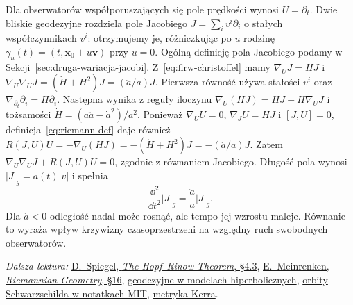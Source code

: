 \begin{przyklad}
\label{prz:flrw-jacobi}
Dla obserwatorów współporuszających się pole prędkości wynosi
$U=\partial_t$. Dwie bliskie geodezyjne rozdziela pole Jacobiego
$J=\sum_i v^i\partial_i$ o stałych współczynnikach $v^i$:
otrzymujemy je, różniczkując po $u$ rodzinę
$\gamma_u(t)=(t,\mathbf x_0+u\mathbf v)$ przy $u=0$.
Ogólną definicję pola Jacobiego podamy w
Sekcji~\ref{sec:druga-wariacja-jacobi}.
Z~\eqref{eq:flrw-christoffel} mamy
$\nabla_UJ=HJ$ i
$\nabla_U\nabla_UJ=(\dot H+H^2)J=(\ddot a/a)J$.
Pierwsza równość używa stałości $v^i$ oraz
$\nabla_{\partial_t}\partial_i=H\partial_i$.
Następna wynika z reguły iloczynu
$\nabla_U(HJ)=\dot HJ+H\nabla_UJ$
i tożsamości
$\dot H=(a\ddot a-\dot a^2)/a^2$.
Ponieważ $\nabla_UU=0$, $\nabla_JU=HJ$ i
$[J,U]=0$, definicja~\eqref{eq:riemann-def}
daje również
$R(J,U)U=-\nabla_U(HJ)
=-(\dot H+H^2)J=-(\ddot a/a)J$.
Zatem
$\nabla_U\nabla_UJ+R(J,U)U=0$, zgodnie z równaniem Jacobiego.
Długość pola wynosi $|J|_g=a(t)|v|$ i spełnia
\[
 \frac{\dd^2}{\dd t^2}|J|_g
 =\frac{\ddot a}{a}|J|_g.
\]
Dla $\ddot a<0$ odległość nadal może rosnąć, ale tempo jej
wzrostu maleje. Równanie to wyraża wpływ krzywizny
czasoprzestrzeni na względny ruch swobodnych obserwatorów.
\end{przyklad}

\par\smallskip
{\footnotesize\noindent\emph{Dalsza lektura:}
\href{https://math.uchicago.edu/~may/REU2016/REUPapers/Spiegel.pdf}
{D.~Spiegel, \emph{The Hopf--Rinow Theorem}, \S4.3},
\href{https://www.math.toronto.edu/mein/teaching/LectureNotes/rieall.pdf}
{E.~Meinrenken, \emph{Riemannian Geometry}, \S16},
\href{https://math.uchicago.edu/~dannyc/courses/kleinian_groups_2015/kleinian_groups.pdf}
{geodezyjne w modelach hiperbolicznych},
\href{https://www.ocw.mit.edu/courses/8-033-relativity-fall-2006/1a22b370b6beb03149dec6e94b24a11b_lecture22_bh2.pdf}
{orbity Schwarzschilda w notatkach MIT},
\href{https://sites.science.oregonstate.edu/coursewikis/GGR/book/content/kerr}
{metryka Kerra}.\par}
